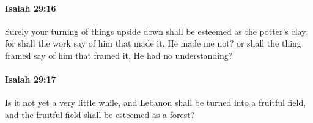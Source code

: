 		\paragraph{Isaiah 29:16} %
			\label{ISAIAH-29-16}

			Surely your turning of things upside down shall be esteemed as the potter's clay: for shall the work say of him that made it, He made me not? or shall the thing framed say of him that framed it, He had no understanding?


		\paragraph{Isaiah 29:17} %
			\label{ISAIAH-29-17}

			Is it not yet a very little while, and Lebanon shall be turned into a fruitful field, and the fruitful field shall be esteemed as a forest?


